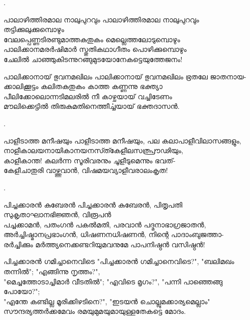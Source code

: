 \begin{enumerate}

. 

\begin{slokam}{\VSv}{\VKG}{പാലാഴിത്തിരമാല നാലുപുറവും}
പാലാഴിത്തിരമാല നാലുപുറവും തട്ടിക്കുലുക്കുമ്പൊഴും\\
വേലപ്പെണ്ണടിരണ്ടുമാത്തകുതുകം മെല്ലെത്തലോടുമ്പൊഴും\\
പാലിക്കാനമരർഷിമാർ സ്തുതികഥാഗീതം പൊഴിക്കുമ്പൊഴും\\
ചേലിൽ ചാഞ്ഞുകിടന്നുറങ്ങുമുടയോനേകട്ടെയുത്തേജനം!
\end{slokam}



\begin{slokam}{\VMk}{\KV}{പാലിക്കാനായ് ഭുവനമഖിലം}
പാലിക്കാനായ് ഭുവനമഖിലം ഭ്രതലേ ജാതനായ-\\
ക്കാലിക്കൂട്ടം കലിതകുതുകം കാത്ത കണ്ണന്നു ഭക്ത്യാ\\
പീലിക്കോലൊന്നടിമലരിൽ നീ കാഴ്ചയായ് വച്ചിടേണം\\
മൗലിക്കെട്ടിൽ തിരുകുമതിനെത്തീൎച്ചയായ് ഭക്തദാസൻ.
\end{slokam}


.



\begin{slokam}{\VSv}{\KJ}{പാളീടാത്ത മനീഷയും}
പാളീടാത്ത മനീഷയും, പല കലാപാളീവിലാസങ്ങളും, \\
നാളീകാലയനായികാനയനസ്ത്കേളീലസത്പ്രൗഢിയും, \\
കാളീകാന്ത! കലർന്ന സൂരിവരനും ചൂളീടുമെന്നും ഭവത്- \\
കേളീചാതുരി വാഴ്ത്തുവാൻ, വിഷമയവ്യാളീവരാലംകൃത!
\end{slokam}


. 


\begin{slokam}{\VSr}{\OKM}{പിച്ചക്കാരൻ കുബേരൻ}
പിച്ചക്കാരൻ കുബേരൻ, പിതൃപതി സുകൃതാഘാനഭിജ്ഞൻ, വിരൂപൻ\\
പച്ചക്കാമൻ, പതംഗൻ പകൽമതി, പരവാൻ പദ്മനാഭാഗ്രജാതൻ,\\
അർച്ചിഷ്മാനപ്രഭാംഗൻ, ധിഷണനധിഷണൻ, നിന്റെ പാദാംബുജത്താ-\\
രർച്ചിക്കും മർത്ത്യനെക്കണ്ടറിയുമവനുമേ പാപനിഷ്ഠൻ വസിഷ്ഠൻ!
\end{slokam}



\begin{slokam}{\VSr}{\ARRV}{പിച്ചക്കാരൻ ഗമിച്ചാനെവിടെ}
"പിച്ചക്കാരൻ ഗമിച്ചാനെവിടെ?", "ബലിമഖം തന്നിൽ"; "എങ്ങിന്നു നൃത്തം?",\\
"മെച്ചത്തോടാച്ചിമാർ വീടതിൽ"; "എവിടെ മൃഗം?", "പന്നി പാഞ്ഞെങ്ങു പോയോ?";\\
"എന്തേ കണ്ടില്ല മൂരിക്കിഴടിനെ?", "ഇടയൻ ചൊല്ലുമക്കാര്യമെല്ലാം"\\
സൗന്ദര്യത്തർക്കമേവം രമയുമുമയുമായുള്ളതേകട്ടെ മോദം.
\end{slokam}


\end{enumerate}
